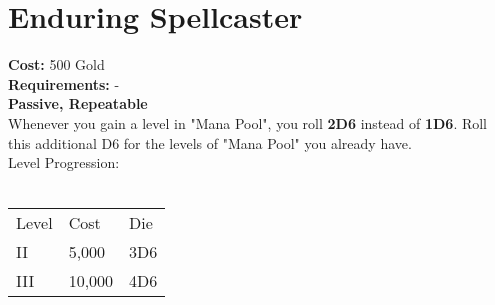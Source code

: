 \section{Enduring Spellcaster}\label{sec:enduringspellcaster}
\textbf{Cost:} 500 Gold\\
\textbf{Requirements:} -\\
\textbf{Passive, Repeatable}\\
Whenever you gain a level in "Mana Pool", you roll \textbf{2D6} instead of \textbf{1D6}.
Roll this additional D6 for the levels of "Mana Pool" you already have.
\\
Level Progression:\\
\\
\begin{tabular}{l | l | l }
	Level & Cost & Die\\
	II & 5,000 & 3D6 \\
	III & 10,000 & 4D6\\
\end{tabular}